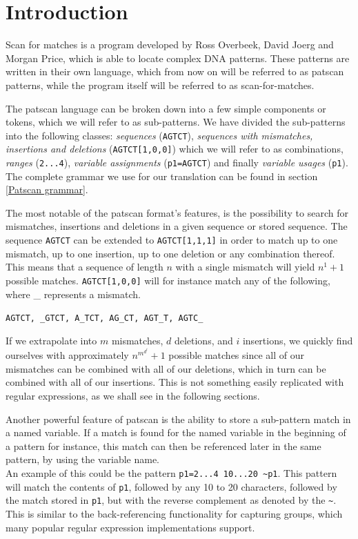 \documentclass[12pt]{article}
\begin{document}
\newpage

\section{Introduction}

Scan for matches is a program developed by Ross Overbeek, David Joerg and Morgan Price, which is able to locate complex DNA patterns.\cite{scan-for-matches} These patterns are written in their own language, which from now on will be referred to as patscan patterns, while the program itself will be referred to as scan-for-matches.

The patscan language can be broken down into a few simple components or tokens, which we will refer to as sub-patterns. We have divided the sub-patterns into the following classes: \textit{sequences} (\texttt{AGTCT}), \textit{sequences with mismatches, insertions and deletions} (\texttt{AGTCT[1,0,0]}) which we will refer to as combinations, \textit{ranges} (\texttt{2...4}), \textit{variable assignments} (\texttt{p1=AGTCT}) and finally \textit{variable usages} (\texttt{p1}). The complete grammar we use for our translation can be found in section \ref{Patscan grammar}.

The most notable of the patscan format's features, is the possibility to search for mismatches, insertions and deletions in a given sequence or stored sequence. The sequence \texttt{AGTCT} can be extended to \texttt{AGTCT[1,1,1]} in order to match up to one mismatch, up to one insertion, up to one deletion or any combination thereof. \\
This means that a sequence of length $n$ with a single mismatch will yield $n^1+1$ possible matches. \texttt{AGTCT[1,0,0]} will for instance match any of the following, where \_ represents a mismatch.

\texttt{AGTCT, \_GTCT, A\_TCT, AG\_CT, AGT\_T, AGTC\_}

If we extrapolate into $m$ mismatches, $d$ deletions, and $i$ insertions, we quickly find ourselves with approximately $n^{m^{d^{i}}}+1$ possible matches since all of our mismatches can be combined with all of our deletions, which in turn can be combined with all of our insertions. This is not something easily replicated with regular expressions, as we shall see in the following sections.

Another powerful feature of patscan is the ability to store a sub-pattern match in a named variable. If a match is found for the named variable in the beginning of a pattern for instance, this match can then be referenced later in the same pattern, by using the variable name. \\
An example of this could be the pattern \texttt{p1=2...4 10...20 \~{}p1}. This pattern will match the contents of \texttt{p1}, followed by any 10 to 20 characters, followed by the match stored in \texttt{p1}, but with the reverse complement as denoted by the \texttt{\~{}}.\\
This is similar to the back-referencing functionality for capturing groups, which many popular regular expression implementations support.%
\end{document}
